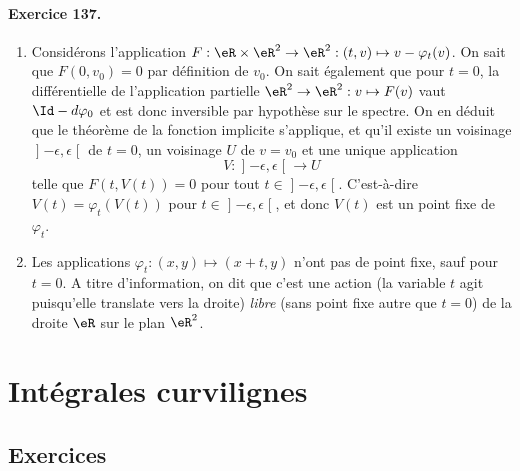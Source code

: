 \paragraph{Exercice 137.}
\begin{enumerate}
\item Considérons l'application $F : \eR\times\eR^2 \to \eR^2 :
(t,v) \mapsto v - \varphi_t(v)$.  On sait que $F(0,v_0) = 0$ par
définition de $v_0$. On sait également que pour $t = 0$, la
différentielle de l'application partielle $\eR^2 \to \eR^2 : v
\mapsto F(v)$ vaut $\Id - d\varphi_0$ et est donc inversible par
hypothèse sur le spectre. On en déduit que le théorème de la
fonction implicite s'applique, et qu'il existe un voisinage
$\mathopen\rbrack-\epsilon,\epsilon\mathclose\lbrack$ de $t = 0$, un
voisinage $U$ de $v = v_0$ et une unique application
\begin{equation*}
V : \mathopen\rbrack-\epsilon,\epsilon\mathclose\lbrack \to U
\end{equation*}
telle que $F(t,V(t)) = 0$ pour tout $t \in
\mathopen\rbrack-\epsilon,\epsilon\mathclose\lbrack$. C'est-à-dire
$V(t) = \varphi_t(V(t))$ pour $t \in
\mathopen\rbrack-\epsilon,\epsilon\mathclose\lbrack$, et donc $V(t)$
est un point fixe de $\varphi_t$.

\item Les applications $\varphi_t : (x,y) \mapsto (x+t,y)$ n'ont pas
de point fixe, sauf pour $t = 0$. A titre d'information, on dit que
c'est une action (la variable $t$ \og agit\fg{} puisqu'elle
translate vers la droite) \emph{libre} (sans point fixe autre que $t
= 0$) de la droite $\eR$ sur le plan $\eR^2$.
\end{enumerate}

\section{Intégrales curvilignes}

\subsection{Exercices}
